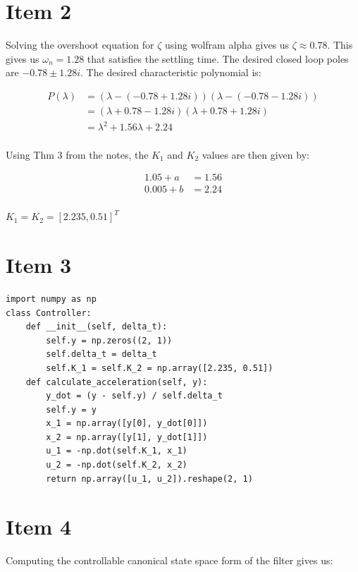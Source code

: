 \documentclass[conference]{IEEEtran}
\begin{document}
\section{Item 2}

Solving the overshoot equation for $\zeta$ using wolfram alpha gives us $\zeta \approx 0.78$. This gives us $\omega_n = 1.28$ that satisfies the settling time. The desired closed loop poles are $-0.78 \pm 1.28i$. The desired characteristic polynomial is:

\begin{align*}
    P(\lambda) &= (\lambda - (-0.78 + 1.28i)) (\lambda - (-0.78 - 1.28i))  \\
    &= (\lambda + 0.78 - 1.28i) (\lambda + 0.78 + 1.28i) \\
    &= \lambda^2 + 1.56 \lambda + 2.24 \\
\end{align*}

Using Thm 3 from the notes, the $K_1$ and $K_2$ values are then given by:

\begin{align*}
    1.05 + a &= 1.56 \\
    0.005 + b &= 2.24 \\
\end{align*}

$K_1 = K_2 = [2.235, 0.51]^T$

\section{Item 3}

\begin{verbatim}
import numpy as np
class Controller:    
    def __init__(self, delta_t):
        self.y = np.zeros((2, 1))
        self.delta_t = delta_t
        self.K_1 = self.K_2 = np.array([2.235, 0.51])
    def calculate_acceleration(self, y):
        y_dot = (y - self.y) / self.delta_t
        self.y = y
        x_1 = np.array([y[0], y_dot[0]])
        x_2 = np.array([y[1], y_dot[1]])
        u_1 = -np.dot(self.K_1, x_1)
        u_2 = -np.dot(self.K_2, x_2)
        return np.array([u_1, u_2]).reshape(2, 1)
\end{verbatim}

\section{Item 4}

Computing the controllable canonical state space form of the filter gives us:
\end{document}
